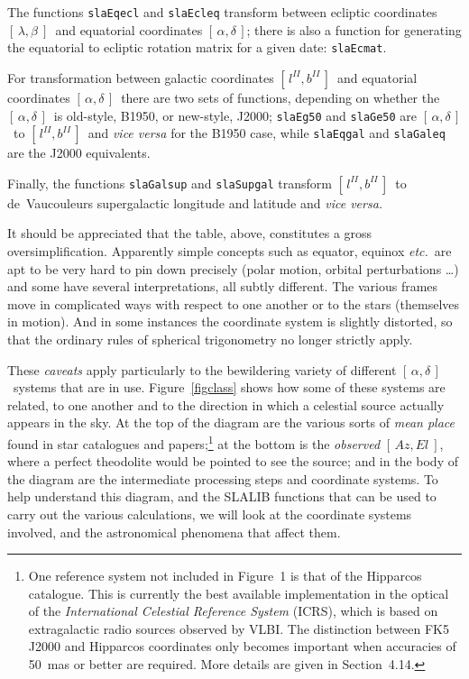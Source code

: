 \documentclass[11pt,fleqn,twoside]{article}
\renewcommand{\_}{{\tt\char'137}}     %
\newcommand{\radec}     {$[\,\alpha,\delta\,]$}
\newcommand{\azel}      {$[\,Az,El~]$}
\newcommand{\ecl}       {$[\,\lambda,\beta~]$}
\newcommand{\gal}       {$[\,l^{I\!I},b^{I\!I}\,]$}
\begin{document}
The functions
{\tt slaEqecl}
and
{\tt slaEcleq}
transform between ecliptic
coordinates \ecl\ and equatorial coordinates
\radec\/; there is also a function for generating the
equatorial to ecliptic rotation matrix for a given date:
{\tt slaEcmat}.
 
For transformation between galactic coordinates \gal\
and equatorial coordinates \radec\ there are
two sets of functions, depending on whether the \radec\ is
old-style, B1950, or new-style, J2000;
{\tt slaEg50}
and
{\tt slaGe50}
are \radec\ to \gal\ and {\it vice versa}\/ for the B1950 case, while
{\tt slaEqgal}
and
{\tt slaGaleq}
are the J2000 equivalents.
 
Finally, the functions
{\tt slaGalsup}
and
{\tt slaSupgal}
transform \gal\ to de~Vaucouleurs supergalactic longitude and latitude
and {\it vice versa.}
 
It should be appreciated that the table, above, constitutes
a gross oversimplification.   Apparently
simple concepts such as equator, equinox
{\it etc.}\ are apt to be very hard to
pin down precisely (polar motion, orbital perturbations \ldots) and
some have several interpretations, all subtly different.  The various
frames move in complicated ways with respect to one another or to
the stars (themselves in motion).  And in some instances the
coordinate system is slightly distorted, so that the
ordinary rules of spherical trigonometry no longer strictly apply.

These {\it caveats}\/
apply particularly to the bewildering variety of different
\radec\ systems that are in use.  Figure~\ref{figclass} shows how
some of these systems are related, to one another and
to the direction in which a celestial source actually
appears in the sky.  At the top of the diagram are
the various sorts of {\it mean place}\/
found in star catalogues and papers;\footnote{One reference
system not included in
Figure~1 is that of the Hipparcos catalogue.  This is currently the
best available implementation in the optical of the {\it International
Celestial Reference System}\/ (ICRS), which is based on extragalactic
radio sources observed by VLBI.  The distinction between FK5 J2000
and Hipparcos coordinates only becomes important when accuracies of
50~mas or better are required.  More details are given in
Section~4.14.} at the bottom is the
{\it observed}\/ \azel, where a perfect theodolite would
be pointed to see the source;  and in the body of
the diagram are
the intermediate processing steps and coordinate
systems.  To help
understand this diagram, and the SLALIB functions that can
be used to carry out the various calculations, we will look at the coordinate
systems involved, and the astronomical phenomena that
affect them.
\end{document}
